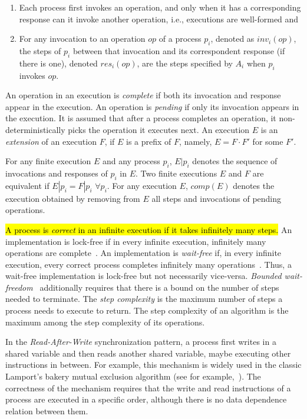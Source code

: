 \begin{enumerate}
    \item Each process first invokes an operation, and only when it has a corresponding response can it invoke another operation, i.e., executions are well-formed and
    \item For any invocation to an operation \(op\) of a process \(p_i\), denoted as \(inv_i(op)\), the steps of \(p_i\) between that invocation and its correspondent response (if there is one), denoted \(res_i(op)\), are the steps specified by \(A_i\) when \(p_i\) invokes \(op\).
\end{enumerate}

An operation in an execution is \emph{complete} if both its invocation and response appear in the execution. An operation is \emph{pending} if only its invocation appears in the execution. It is assumed that after a process completes an operation, it non-deterministically picks the operation it executes next. An execution \(E\) is an \emph{extension} of an execution \(F\), if \(E\) is a prefix of \(F\), namely, \(E = F\cdot F'\) for some \(F'\).

For any finite execution \(E\) and any process \(p_i\), \(E|p_i\) denotes the sequence of invocations and responses of \(p_i\) in \(E\). Two finite executions \(E\) and \(F\) are equivalent if \(E|p_i = F|p_i\) \(\forall p_i\). For any execution \(E\), \(comp(E)\) denotes the execution obtained by removing from \(E\) all steps and invocations of pending operations.

\hl{A process is \emph{correct} in an infinite execution if it takes infinitely many steps.} An implementation is lock-free if in every infinite execution, infinitely many operations are complete~\cite{DBLP_journals_toplas_HerlihyW90}. An implementation is \emph{wait-free} if, in every infinite execution, every correct process completes infinitely many operations~\cite {DBLP_journals_toplas_Herlihy91}. Thus, a wait-free implementation is lock-free but not necessarily vice-versa. \emph{Bounded wait-freedom}~\cite{DBLP_conf_spaa_Herlihy91} additionally requires that there is a bound on the number of steps needed to terminate. The \emph{step complexity} is the maximum number of steps a process needs to execute to return. The step complexity of an algorithm is the maximum among the step complexity of its operations.

In the \emph{Read-After-Write} synchronization pattern, a process first writes in a shared variable and then reads another shared variable, maybe executing other instructions in between. For example, this mechanism is widely used in the classic Lamport's bakery mutual exclusion algorithm (see for example,~\cite {DBLP_books_daglib_0020056}). The correctness of the mechanism requires that the write and read instructions of a process are executed in a specific order, although there is no data dependence relation between them.

